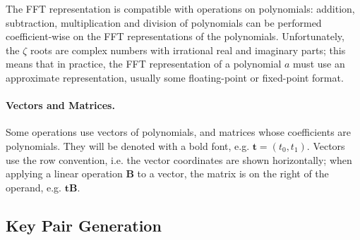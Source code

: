 \documentclass{llncs}
\begin{document}
The FFT representation is compatible with operations on polynomials:
addition, subtraction, multiplication and division of polynomials can be
performed coefficient-wise on the FFT representations of the
polynomials. Unfortunately, the $\zeta$ roots are complex numbers with
irrational real and imaginary parts; this means that in practice, the
FFT representation of a polynomial $a$ must use an approximate
representation, usually some floating-point or fixed-point format.

\paragraph{Vectors and Matrices.}
Some operations use vectors of polynomials, and matrices whose
coefficients are polynomials. They will be denoted with a bold font,
e.g. $\mathbf{t} = (t_0, t_1)$. Vectors use the row convention, i.e.
the vector coordinates are shown horizontally; when applying a linear
operation $\mathbf{B}$ to a vector, the matrix is on the right of
the operand, e.g. $\mathbf{t} \mathbf{B}$.

\subsection{Key Pair Generation}
\end{document}
